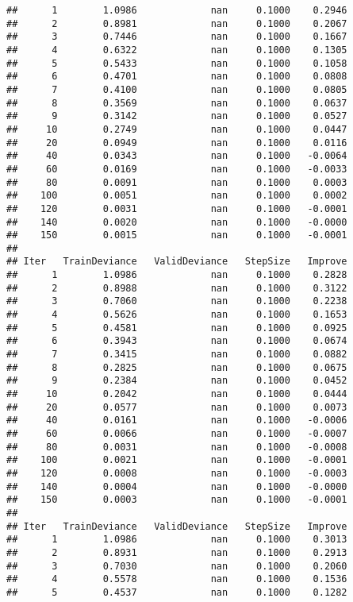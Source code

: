 \documentclass[
]{article}
\begin{document}
\begin{verbatim}
##      1        1.0986             nan     0.1000    0.2946
##      2        0.8981             nan     0.1000    0.2067
##      3        0.7446             nan     0.1000    0.1667
##      4        0.6322             nan     0.1000    0.1305
##      5        0.5433             nan     0.1000    0.1058
##      6        0.4701             nan     0.1000    0.0808
##      7        0.4100             nan     0.1000    0.0805
##      8        0.3569             nan     0.1000    0.0637
##      9        0.3142             nan     0.1000    0.0527
##     10        0.2749             nan     0.1000    0.0447
##     20        0.0949             nan     0.1000    0.0116
##     40        0.0343             nan     0.1000   -0.0064
##     60        0.0169             nan     0.1000   -0.0033
##     80        0.0091             nan     0.1000    0.0003
##    100        0.0051             nan     0.1000    0.0002
##    120        0.0031             nan     0.1000   -0.0001
##    140        0.0020             nan     0.1000   -0.0000
##    150        0.0015             nan     0.1000   -0.0001
## 
## Iter   TrainDeviance   ValidDeviance   StepSize   Improve
##      1        1.0986             nan     0.1000    0.2828
##      2        0.8988             nan     0.1000    0.3122
##      3        0.7060             nan     0.1000    0.2238
##      4        0.5626             nan     0.1000    0.1653
##      5        0.4581             nan     0.1000    0.0925
##      6        0.3943             nan     0.1000    0.0674
##      7        0.3415             nan     0.1000    0.0882
##      8        0.2825             nan     0.1000    0.0675
##      9        0.2384             nan     0.1000    0.0452
##     10        0.2042             nan     0.1000    0.0444
##     20        0.0577             nan     0.1000    0.0073
##     40        0.0161             nan     0.1000   -0.0006
##     60        0.0066             nan     0.1000   -0.0007
##     80        0.0031             nan     0.1000   -0.0008
##    100        0.0021             nan     0.1000   -0.0001
##    120        0.0008             nan     0.1000   -0.0003
##    140        0.0004             nan     0.1000   -0.0000
##    150        0.0003             nan     0.1000   -0.0001
## 
## Iter   TrainDeviance   ValidDeviance   StepSize   Improve
##      1        1.0986             nan     0.1000    0.3013
##      2        0.8931             nan     0.1000    0.2913
##      3        0.7030             nan     0.1000    0.2060
##      4        0.5578             nan     0.1000    0.1536
##      5        0.4537             nan     0.1000    0.1282

\end{verbatim}
\end{document}
